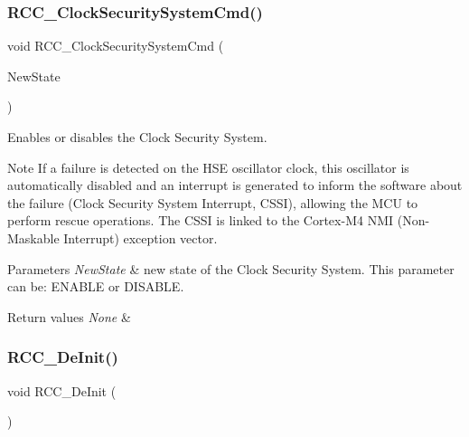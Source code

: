 \subsubsection{\texorpdfstring{R\+C\+C\+\_\+\+Clock\+Security\+System\+Cmd()}{RCC\_ClockSecuritySystemCmd()}}
{\footnotesize\ttfamily void R\+C\+C\+\_\+\+Clock\+Security\+System\+Cmd (\begin{DoxyParamCaption}\item[{Functional\+State}]{New\+State }\end{DoxyParamCaption})}



Enables or disables the Clock Security System. 

\begin{DoxyNote}{Note}
If a failure is detected on the H\+SE oscillator clock, this oscillator is automatically disabled and an interrupt is generated to inform the software about the failure (Clock Security System Interrupt, C\+S\+SI), allowing the M\+CU to perform rescue operations. The C\+S\+SI is linked to the Cortex-\/\+M4 N\+MI (Non-\/\+Maskable Interrupt) exception vector. ~\newline

\end{DoxyNote}

\begin{DoxyParams}{Parameters}
{\em New\+State} & new state of the Clock Security System. This parameter can be\+: E\+N\+A\+B\+LE or D\+I\+S\+A\+B\+LE. \\
\hline
\end{DoxyParams}

\begin{DoxyRetVals}{Return values}
{\em None} & \\
\hline
\end{DoxyRetVals}
\mbox{\label{group___r_c_c___group1_ga413f6422be11b1334abe60b3bff2e062}} 
\subsubsection{\texorpdfstring{R\+C\+C\+\_\+\+De\+Init()}{RCC\_DeInit()}}
{\footnotesize\ttfamily void R\+C\+C\+\_\+\+De\+Init (\begin{DoxyParamCaption}\item[{void}]{ }\end{DoxyParamCaption})}



